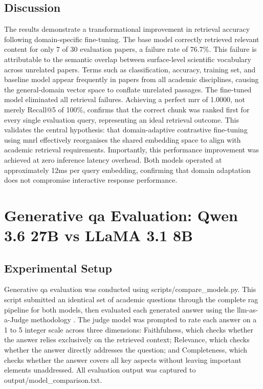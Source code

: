 \subsection{Discussion}

The results demonstrate a transformational improvement in retrieval accuracy following domain-specific fine-tuning. The base model correctly retrieved relevant content for only 7 of 30 evaluation papers, a failure rate of 76.7\%. This failure is attributable to the semantic overlap between surface-level scientific vocabulary across unrelated papers. Terms such as classification, accuracy, training set, and baseline model appear frequently in papers from all academic disciplines, causing the general-domain vector space to conflate unrelated passages.
\newline \newline The fine-tuned model eliminated all retrieval failures. Achieving a perfect \gls{mrr} of 1.0000, not merely Recall@5 of 100\%, confirms that the correct chunk was ranked first for every single evaluation query, representing an ideal retrieval outcome. This validates the central hypothesis: that domain-adaptive contrastive fine-tuning using \gls{mnrl} effectively reorganises the shared embedding space to align with academic retrieval requirements.
\newline \newline Importantly, this performance improvement was achieved at zero inference latency overhead. Both models operated at approximately 12ms per query embedding, confirming that domain adaptation does not compromise interactive response performance.

\section{Generative \gls{qa} Evaluation: Qwen 3.6 27B vs LLaMA 3.1 8B}

\subsection{Experimental Setup}

Generative \gls{qa} evaluation was conducted using scripts/compare\_models.py. This script submitted an identical set of academic questions through the complete \gls{rag} pipeline for both models, then evaluated each generated answer using the \gls{llm}-as-a-Judge methodology \citep{zheng2023judging}. The judge model was prompted to rate each answer on a 1 to 5 integer scale across three dimensions: Faithfulness, which checks whether the answer relies exclusively on the retrieved context; Relevance, which checks whether the answer directly addresses the question; and Completeness, which checks whether the answer covers all key aspects without leaving important elements unaddressed. All evaluation output was captured to output/model\_comparison.txt.

